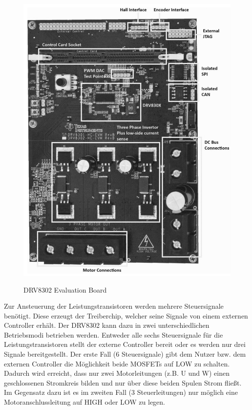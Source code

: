 \begin{figure}[htbp]
	\centering
	\includegraphics[width=\textwidth]{hardware/graphics/TI_Eval_Board}
	\caption{DRV8302 Evaluation Board}
	\quelle \cite{Instruments2014}
	\label{fig:DRV8302Board}
\end{figure}

Zur Ansteuerung der Leistungstransistoren werden mehrere Steuersignale benötigt.
Diese erzeugt der Treiberchip, welcher seine Signale von einem externen Controller erhält.
Der DRV8302 kann dazu in zwei unterschiedlichen Betriebsmodi betrieben werden.
Entweder alle sechs Steuersignale für die Leistungstransistoren stellt der externe Controller bereit oder es werden nur drei Signale bereitgestellt.
Der erste Fall (6 Steuersignale) gibt dem Nutzer bzw. dem externen Controller die Möglichkeit beide MOSFETs auf LOW zu schalten.
Dadurch wird erreicht, dass nur zwei Motorleitungen (z.B. U und W) einen geschlossenen Stromkreis bilden und nur über diese beiden Spulen Strom fließt.
Im Gegensatz dazu ist es im zweiten Fall (3 Steuerleitungen) nur möglich eine Motoranschlussleitung auf HIGH oder LOW zu legen. 


